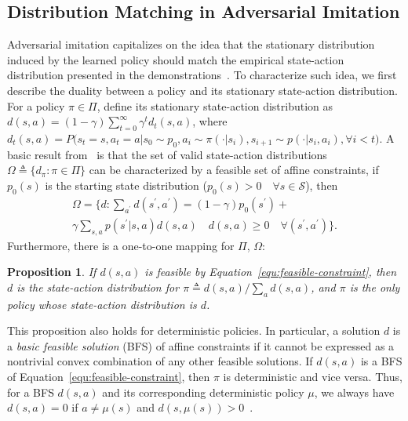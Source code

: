 \documentclass[letterpaper]{article} %
\newtheorem{proposition}{Proposition}
\begin{document}
\subsection{Distribution Matching in Adversarial Imitation}\label{sec:duality}
Adversarial imitation capitalizes on the idea that the stationary distribution induced by the learned policy should match the empirical state-action distribution presented in the demonstrations~\cite{ho2016generative}. 
To characterize such idea, we first describe the duality between a policy and its stationary state-action distribution. 
For a policy $\pi\in\Pi$, define its stationary state-action distribution as  $d(s, a)=(1-\gamma)\sum_{t=0}^{\infty}\gamma^t d_t(s, a)$, 
where $d_t(s, a)=P \big( s_t=s, a_t=a|s_0\sim p_0, a_i\sim\pi(\cdot|s_i), s_{i+1}\sim p(\cdot|s_i, a_i), \forall i<t \big)$.
A basic result from~\citet{puterman2014markov} is that the set of valid state-action distributions $\Omega\triangleq\{d_{\pi}: \pi\in\Pi\}$ can be characterized by a feasible set of affine constraints, 
if $p_0(s)$ is the starting state distribution ($p_0(s)>0 \quad \forall s\in\mathcal{S}$), then
\begin{multline}\label{equ:feasible-constraint}
\Omega=\big\{d: \sum_{a^\prime} d(s^\prime, a^\prime) = (1-\gamma) p_0(s^\prime) + \\
\gamma\sum_{s, a}p(s^\prime|s, a)d(s, a) \quad d(s, a)\geq 0 \quad \forall (s^\prime, a^\prime)
\big\}.
\end{multline}
Furthermore, there is a one-to-one mapping for $\Pi$, $\Omega$:
\begin{proposition}\label{prop:one-one-correspondence}
\cite{syed2007game} If $d(s, a)$ is feasible by Equation~\eqref{equ:feasible-constraint}, then $d$ is the state-action distribution for $\pi\triangleq d(s, a)/\sum_{a}d(s, a)$, and $\pi$ is the only policy whose state-action distribution is $d$. 
\end{proposition} 
This proposition also holds for deterministic policies.
In particular, a solution $d$ is a \emph{basic feasible solution} (BFS) of affine constraints if it cannot be expressed as a nontrivial convex combination of any other feasible solutions. 
If $d(s, a)$ is a BFS of Equation~\eqref{equ:feasible-constraint}, then $\pi$ is deterministic and vice versa. 
Thus, for a BFS $d(s, a)$ and its corresponding deterministic policy $\mu$, we always have $d(s, a)=0$ if $a\neq\mu(s)$ and $d(s, \mu(s))>0$~\cite{puterman2014markov}. 
\end{document}
